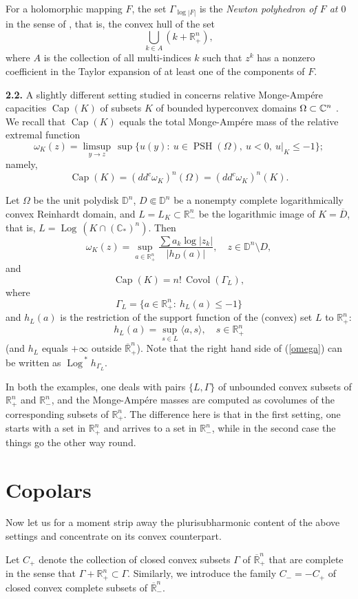 \documentclass[12pt]{article}
\newcommand{\beq}{\begin{equation}}
\newcommand{\eeq}{\end{equation}}
\numberwithin{equation}{section}
\newcommand{\PSH}{{\operatorname{PSH}}}
\newcommand{\Covol}{{\operatorname{Covol}}}
\newcommand{\Capa}{{\operatorname{Cap}}}
\newcommand{\Log}{{\operatorname{Log}\,}}
\newcommand{\D}{{\mathbb D}}
\newcommand{\Rnm}{{\mathbb R}_-^n}
\newcommand{\Rnp}{{\mathbb R}_+^n}
\newcommand{\C}{{\mathbb  C}}
\newcommand{\Cn}{{\mathbb  C\sp n}}
\begin{document}
For a holomorphic mapping $F$, the set $\Gamma_{\log|F|}$ is the {\sl Newton polyhedron of $F$ at $0$} in the sense of \cite{Ku1}, that is, the convex hull of the set
$$\bigcup_{k\in A} (k+\Rnp),$$ where $A$ is the collection of all multi-indices $k$ such that $z^k$ has a nonzero coefficient in the Taylor expansion of at least one of the components of $F$.

\bigskip
\noindent
{\bf 2.2.}   A slightly different setting studied in \cite{ARZ} concerns relative Monge-Amp\'ere capacities $\Capa(K)$
of subsets $K$ of bounded hyperconvex domains $\Omega\subset\Cn$ .
We recall that $\Capa(K)$ equals the total Monge-Amp\'ere mass of the relative extremal function
\beq\label{relext}\omega_K(z)=\limsup_{y\to z}\,\sup\{u(y):\: u\in\PSH(\Omega),\ u<0, \ u|_K\le-1\};\eeq
namely,
$$ \Capa(K)=(dd^c\omega_K)^n(\Omega)=(dd^c\omega_K)^n(K).$$

Let $\Omega$ be the unit polydisk $\D^n$, $D\Subset \D^n$ be a nonempty complete logarithmically convex Reinhardt domain, and $L=L_K\subset\Rnm$ be the logarithmic image of $K=\overline D$, that is, $L=\Log(K\cap (\C_*)^n)$. Then
\beq\label{omega} \omega_K(z)=\sup_{a\in\Rnp}\frac{\sum a_k\log|z_k|}{|h_D(a)|}, \quad z\in \D^n\setminus D,\eeq
and
\beq\label{CapK}\Capa(K)=n!\,\Covol(\Gamma_L),\eeq
where
\beq\label{GL} \Gamma_L=\{a\in\Rnp:\: h_L(a)\le -1\}\eeq
and $h_L(a)$ is the restriction of the support function of the (convex) set $L$ to $\Rnp$:
$$h_L(a)=\sup_{s\in L} \langle a,s\rangle,\quad s\in\Rnp$$
(and $h_L$ equals $+\infty$ outside $\overline\Rnp$).
Note that the right hand side of (\ref{omega}) can be written as $\Log^* h_{\Gamma_L}$.

In both the examples, one deals with pairs $\{L,\Gamma\}$ of unbounded convex subsets of $\Rnp$ and $\Rnm$, and the Monge-Amp\'ere masses are computed as covolumes of the corresponding subsets of $\Rnp$. The difference here is that in the first setting, one starts with a set in $\Rnp$ and arrives to a set in $\Rnm$, while in the second case the things go the other way round.


\section{Copolars}
\label{Copolars}

Now let us for a moment strip away the plurisubharmonic content of the above settings and concentrate on its convex counterpart.

Let $C_+$ denote the collection of closed convex subsets $\Gamma$ of $\overline\Rnp$ that are complete in the sense that $\Gamma+\Rnp\subset\Gamma$. Similarly, we introduce the family $C_-=-C_+$ of closed convex complete subsets of $\overline\Rnm$.
\end{document}
